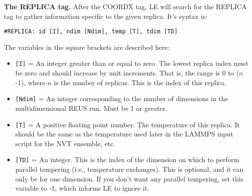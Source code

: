 \documentclass[10pt]{article}
\begin{document}
\textbf{The REPLICA tag.}
After the COORDX tag, LE will search for the REPLICA tag to gather information specific
to the given replica. It's syntax is:
\begin{verbatim}
#REPLICA: id [I], ndim [Ndim], temp [T], tdim [TD]
\end{verbatim}
The variables in the square brackets are described here:
\begin{itemize}
\item	\texttt{[I]} = An integer greater than or equal to zero. The lowest
		replica index must be zero and should increase by unit increments. That is,
		the range is 0 to ($n$-1), where $n$ is the number of replicas. This is
		the index of this replica.
\item	\texttt{[Ndim]} = An integer corresponding to the number of dimensions
		in the multidimensional REUS run. Must be 1 or greater.
\item	\texttt{[T]} = A positive floating point number. The temperature of this replica.
		It should be the same as the temperature used later in the LAMMPS input script
		for the NVT ensemble, etc.
\item	\texttt{[TD]} = An integer. This is the index of the dimension on which to perform
		parallel tempering (i.e., temperature exchanges). This is optional, and it can only be
		for one dimension. If you don't want any parallel tempering, set this variable to -1,
		which informs LE to ignore it.
\end{itemize}
\end{document}
